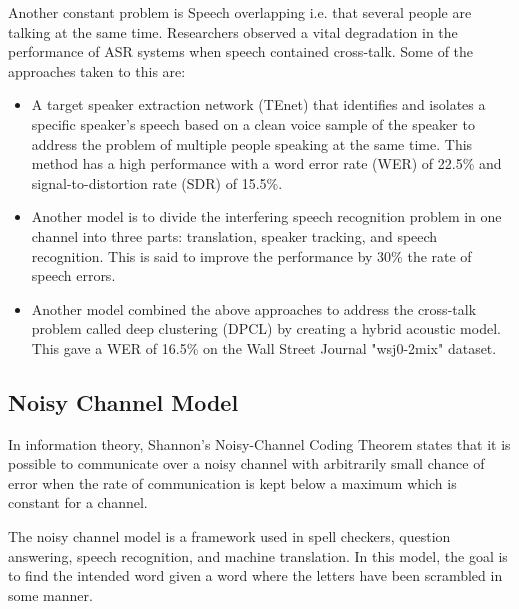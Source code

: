Another constant problem is Speech overlapping i.e. that several people are talking at the same time. Researchers observed a vital degradation in the performance of ASR systems when speech contained cross-talk. Some of the approaches taken to this are: \cite{alharbi_automatic_2021}

\begin{itemize}
    \item A target speaker extraction network (TEnet) that identifies and isolates a specific speaker's speech based on a clean voice sample of the speaker to address the problem of multiple people speaking at the same time. This method has a high performance with a word error rate (WER) of 22.5\% and signal-to-distortion rate (SDR) of 15.5\%. 
    \item Another model is to divide the interfering speech recognition problem in one channel into three parts: translation, speaker tracking, and speech recognition. This is said to improve the performance by 30\% the rate of speech errors. 
    \item Another model combined the above approaches to address the cross-talk problem called deep clustering (DPCL) by creating a hybrid acoustic model. This gave a WER of 16.5\% on the Wall Street Journal "wsj0-2mix" dataset.    
\end{itemize}

\subsection{Noisy Channel Model}
\label{sub:noisy_channel_model}

In information theory, Shannon's Noisy-Channel Coding Theorem states that it is possible to communicate over a noisy channel with arbitrarily small chance of error when the rate of communication is kept below a maximum which is constant for a channel.

The noisy channel model is a framework used in spell checkers, question answering, speech recognition, and machine translation. In this model, the goal is to find the intended word given a word where the letters have been scrambled in some manner.

